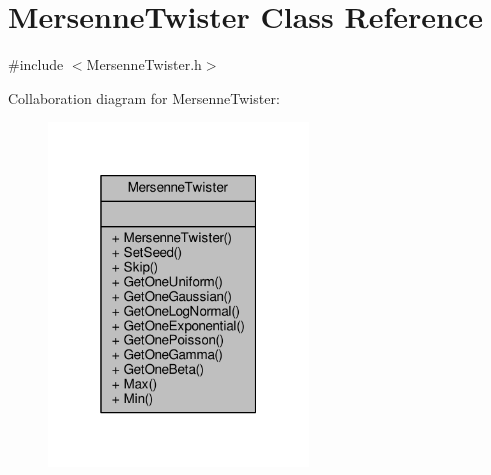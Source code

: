 \hypertarget{classMersenneTwister}{}\section{Mersenne\+Twister Class Reference}
\label{classMersenneTwister}


{\ttfamily \#include $<$Mersenne\+Twister.\+h$>$}



Collaboration diagram for Mersenne\+Twister\+:
\nopagebreak
\begin{figure}[H]
\begin{center}
\leavevmode
\includegraphics[width=196pt]{classMersenneTwister__coll__graph}
\end{center}
\end{figure}
